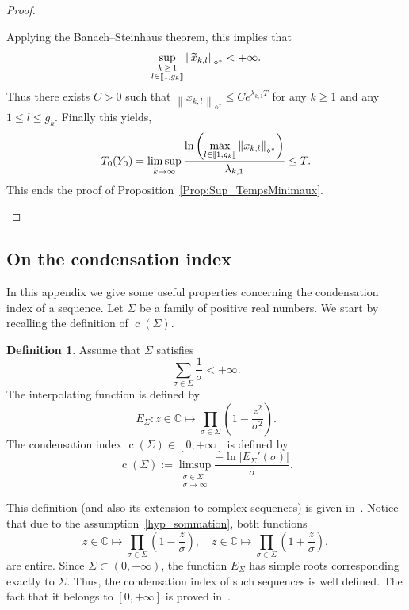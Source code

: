 \documentclass[11pt]{article}
\theoremstyle{definition}
\newtheorem{defi}[theo]{Definition}
\numberwithin{equation}{section}
\numberwithin{figure}{section}
\numberwithin{table}{section}
\newcommand{\llbracket}{\mathopen{[\mkern -2.7mu[}}
\newcommand{\rrbracket}{\mathclose{]\mkern -2.7mu]}}
\newcommand{\inter}[2]{\llbracket #1,#2 \rrbracket}
\newcommand{\Fzp}{Y_0}
\newcommand{\normeXalphas}[1]{\left\| #1 \right\|_{\diamond^*}}
\newcommand{\n}{g}
\newcommand{\C}{\mathbb{C}}
\DeclareMathOperator{\cond}{c}
\let\oldtilde\tilde
\renewcommand*{\tilde}[1]{\mathchoice{\widetilde{#1}}{\widetilde{#1}}{\oldtilde{#1}}{\oldtilde{#1}}}\let\oldexists\exists
\renewcommand*{\exists}{\mathrel{\oldexists}}
\begin{document}
\begin{proof}
\begin{itemize}
Applying the Banach--Steinhaus theorem, this implies that
\[
\sup_{\substack{k\,\geq\,1 \\ l\in \inter{1}{\n_k}}} \normeXalphas{ \tilde{x}_{k,l} } < + \infty.
\]
Thus there exists $C>0$ such that $\normeXalphas{x_{k,l}} \leq C e^{\lambda_{k,1} T}$ for any $k \geq 1$ and any $1\leq l\leq \n_k$. Finally this yields,
\[
T_{0}(\Fzp) = \limsup_{k \to \infty} \frac{\ln \left(\max\limits_{l\in \inter{1}{\n_k}} \normeXalphas{ x_{k,l} } \right)}{\lambda_{k,1}} \leq T.
\]
This ends the proof of Proposition~\ref{Prop:Sup_TempsMinimaux}.
\end{itemize}
\end{proof}



\subsection{On the condensation index} \label{AnnexeCondensation}


In this appendix we give some useful properties concerning the condensation index of a sequence. Let $\Sigma$ be a family of positive real numbers. We start by recalling the definition of $\cond(\Sigma)$.
\begin{defi} \label{Def:Condensation_Shackell}
Assume that $\Sigma$ satisfies
\begin{equation}\label{hyp_sommation}
\sum\limits_{\sigma\in \Sigma} \frac{1}{\sigma} <+\infty.
\end{equation}
The interpolating function is defined by
\begin{equation}\label{DefE}
E_\Sigma : z \in \C \mapsto \prod_{\sigma\in \Sigma}\left(1 - \frac{z^2}{\sigma^2} \right).
\end{equation}
The condensation index $\cond(\Sigma)\in [0,+\infty]$ is defined by
\[
\cond(\Sigma) := \limsup_{\substack{\sigma\in\Sigma\\ \sigma \to \infty}} \frac{- \ln |E_\Sigma'(\sigma)|}{\sigma}.
\]
\end{defi}
This definition (and also its extension to complex sequences) is given in~\cite{Shackell69}. Notice that due to the assumption~\eqref{hyp_sommation}, both functions
\[
z \in \C \mapsto \prod_{\sigma\in \Sigma}\left(1 - \frac{z}{\sigma} \right),
\quad z \in \C \mapsto \prod_{\sigma\in \Sigma}\left(1 + \frac{z}{\sigma} \right),
\]
are entire. Since $\Sigma \subset (0, +\infty)$, the function $E_\Sigma$ has simple roots corresponding exactly to $\Sigma$. Thus, the condensation index of such sequences is well defined. The fact that it belongs to $[0,+\infty]$ is proved in~\cite{AmmarKhodjaBenabdallahGonzalez-BurgosdeTeresa:2014}.
\end{document}
